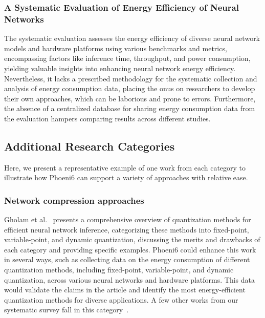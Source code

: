 \subsubsection{A Systematic Evaluation of Energy Efficiency of Neural Networks \cite{wang2020systematic}} The systematic evaluation assesses the energy efficiency of diverse neural network models and hardware platforms using various benchmarks and metrics, encompassing factors like inference time, throughput, and power consumption, yielding valuable insights into enhancing neural network energy efficiency. Nevertheless, it lacks a prescribed methodology for the systematic collection and analysis of energy consumption data, placing the onus on researchers to develop their own approaches, which can be laborious and prone to errors. Furthermore, the absence of a centralized database for sharing energy consumption data from the evaluation hampers comparing results across different studies.

\subsection{Additional Research Categories}
\label{subsec:other-categories}

Here, we present a representative example of one work from each category to illustrate how Phoeni6 can support a variety of approaches with relative ease.

\subsubsection{Network compression approaches} 
Gholam et al.~\cite{Survey-Quantization-2021} presents a comprehensive overview of quantization methods for efficient neural network inference, categorizing these methods into fixed-point, variable-point, and dynamic quantization, discussing the merits and drawbacks of each category and providing specific examples. Phoeni6 could enhance this work in several ways, such as collecting data on the energy consumption of different quantization methods, including fixed-point, variable-point, and dynamic quantization, across various neural networks and hardware platforms. This data would validate the claims in the article and identify the most energy-efficient quantization methods for diverse applications.
%
A few other works from our systematic survey fall in this category~\cite{zhou2016dorefa,gong2019differentiable,dotzel2023fliqs}.


